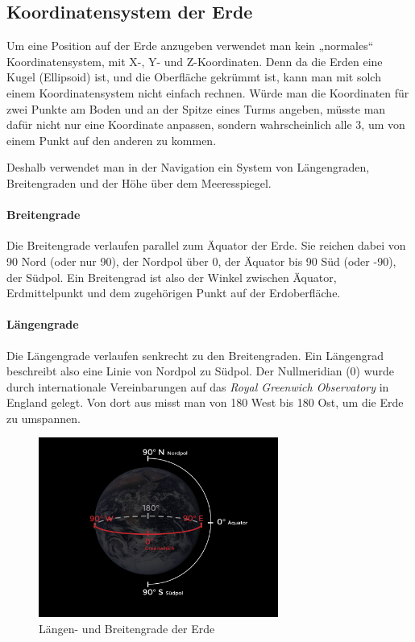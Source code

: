 \documentclass[12pt,a4paper]{scrartcl}
\begin{document}
\subsection{Koordinatensystem der Erde}
Um eine Position auf der Erde anzugeben verwendet man kein „normales“ Koordinatensystem, mit X-, Y- und Z-Koordinaten. Denn da die Erden eine Kugel (Ellipsoid) ist, und die Oberfläche gekrümmt ist, kann man mit solch einem Koordinatensystem nicht einfach rechnen. Würde man die Koordinaten für zwei Punkte am Boden und an der Spitze eines Turms angeben, müsste man dafür nicht nur eine Koordinate anpassen, sondern wahrscheinlich alle 3, um von einem Punkt auf den anderen zu kommen.

Deshalb verwendet man in der Navigation ein System von Längengraden, Breitengraden und der Höhe über dem Meeresspiegel.

\paragraph{Breitengrade} Die Breitengrade verlaufen parallel zum Äquator der Erde. Sie reichen dabei von 90\degree{} Nord (oder nur 90\degree), der Nordpol über 0\degree, der Äquator bis 90\degree{} Süd (oder -90\degree), der Südpol. Ein Breitengrad ist also der Winkel zwischen Äquator, Erdmittelpunkt und dem zugehörigen Punkt auf der Erdoberfläche.

\paragraph{Längengrade}
Die Längengrade verlaufen senkrecht zu den Breitengraden. Ein Längengrad beschreibt also eine Linie von Nordpol zu Südpol. Der Nullmeridian (0\degree{}) wurde durch internationale Vereinbarungen auf das \emph{Royal Greenwich Observatory} in England gelegt. Von dort aus misst man von 180\degree{} West bis 180\degree{} Ost, um die Erde zu umspannen.

\begin{figure}
\centering
\includegraphics[width=0.7\textwidth]{img/latlong-01.png}
\caption{Längen- und Breitengrade der Erde}
\end{figure}
\end{document}
